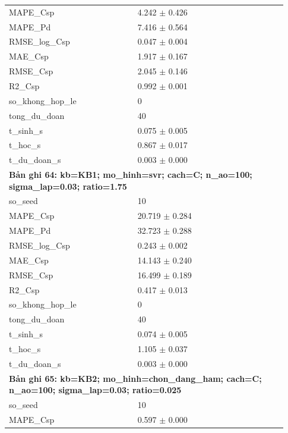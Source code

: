\begin{longtable}{p{0.43\linewidth}p{0.50\linewidth}}
MAPE\_\allowbreak Csp & 4.242 $\pm$ 0.426 \\
MAPE\_\allowbreak Pd & 7.416 $\pm$ 0.564 \\
RMSE\_\allowbreak log\_\allowbreak Csp & 0.047 $\pm$ 0.004 \\
MAE\_\allowbreak Csp & 1.917 $\pm$ 0.167 \\
RMSE\_\allowbreak Csp & 2.045 $\pm$ 0.146 \\
R2\_\allowbreak Csp & 0.992 $\pm$ 0.001 \\
so\_\allowbreak khong\_\allowbreak hop\_\allowbreak le & 0 \\
tong\_\allowbreak du\_\allowbreak doan & 40 \\
t\_\allowbreak sinh\_\allowbreak s & 0.075 $\pm$ 0.005 \\
t\_\allowbreak hoc\_\allowbreak s & 0.867 $\pm$ 0.017 \\
t\_\allowbreak du\_\allowbreak doan\_\allowbreak s & 0.003 $\pm$ 0.000 \\
\midrule
\multicolumn{2}{p{0.95\linewidth}}{\textbf{Bản ghi 64: kb=KB1; mo\_hinh=svr; cach=C; n\_ao=100; sigma\_lap=0.03; ratio=1.75}} \\
so\_\allowbreak seed & 10 \\
MAPE\_\allowbreak Csp & 20.719 $\pm$ 0.284 \\
MAPE\_\allowbreak Pd & 32.723 $\pm$ 0.288 \\
RMSE\_\allowbreak log\_\allowbreak Csp & 0.243 $\pm$ 0.002 \\
MAE\_\allowbreak Csp & 14.143 $\pm$ 0.240 \\
RMSE\_\allowbreak Csp & 16.499 $\pm$ 0.189 \\
R2\_\allowbreak Csp & 0.417 $\pm$ 0.013 \\
so\_\allowbreak khong\_\allowbreak hop\_\allowbreak le & 0 \\
tong\_\allowbreak du\_\allowbreak doan & 40 \\
t\_\allowbreak sinh\_\allowbreak s & 0.074 $\pm$ 0.005 \\
t\_\allowbreak hoc\_\allowbreak s & 1.105 $\pm$ 0.037 \\
t\_\allowbreak du\_\allowbreak doan\_\allowbreak s & 0.003 $\pm$ 0.000 \\
\midrule
\multicolumn{2}{p{0.95\linewidth}}{\textbf{Bản ghi 65: kb=KB2; mo\_hinh=chon\_dang\_ham; cach=C; n\_ao=100; sigma\_lap=0.03; ratio=0.025}} \\
so\_\allowbreak seed & 10 \\
MAPE\_\allowbreak Csp & 0.597 $\pm$ 0.000 \\

\end{longtable}
